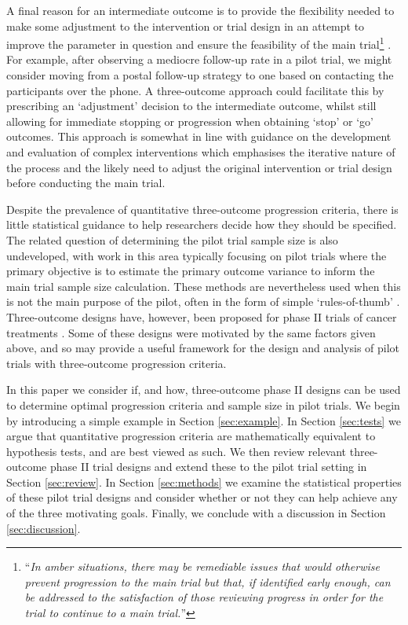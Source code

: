 \documentclass{bmcart}
\begin{document}
A final reason for an intermediate outcome is to provide the flexibility needed to make some adjustment to the intervention or trial design in an attempt to improve the parameter in question and ensure the feasibility of the main trial\footnote{``\emph{In amber situations, there may be remediable issues that would otherwise prevent progression to the main trial but that, if identified early enough, can be addressed to the satisfaction of those reviewing progress in order for the trial to continue to a main trial.}''} \cite{Avery2017}. For example, after observing a mediocre follow-up rate in a pilot trial, we might consider moving from a postal follow-up strategy to one based on contacting the participants over the phone. A three-outcome approach could facilitate this by prescribing an `adjustment' decision to the intermediate outcome, whilst still allowing for immediate stopping or progression when obtaining `stop' or `go' outcomes. This approach is somewhat in line with guidance on the development and evaluation of complex interventions \cite{Craig2008} which emphasises the iterative nature of the process and the likely need to adjust the original intervention or trial design before conducting the main trial.

Despite the prevalence of quantitative three-outcome progression criteria\cite{Herbert2019}, there is little statistical guidance to help researchers decide how they should be specified. The related question of determining the pilot trial sample size is also undeveloped, with work in this area typically focusing on pilot trials where the primary objective is to estimate the primary outcome variance to inform the main trial sample size calculation. These methods are nevertheless used when this is not the main purpose of the pilot, often in the form of simple `rules-of-thumb' \cite{Browne1995, Teare2014, Whitehead2015}. Three-outcome designs have, however, been proposed for phase II trials of cancer treatments \cite{Kirby2016}. Some of these designs were motivated by the same factors given above, and so may provide a useful framework for the design and analysis of pilot trials with three-outcome progression criteria.

In this paper we consider if, and how, three-outcome phase II designs can be used to determine optimal progression criteria and sample size in pilot trials. We begin by introducing a simple example in Section \ref{sec:example}. In Section \ref{sec:tests} we argue that quantitative progression criteria are mathematically equivalent to hypothesis tests, and are best viewed as such. We then review relevant three-outcome phase II trial designs and extend these to the pilot trial setting in Section \ref{sec:review}. In Section \ref{sec:methods} we examine the statistical properties of these pilot trial designs and consider whether or not they can help achieve any of the three motivating goals. Finally, we conclude with a discussion in Section \ref{sec:discussion}.
\end{document}
